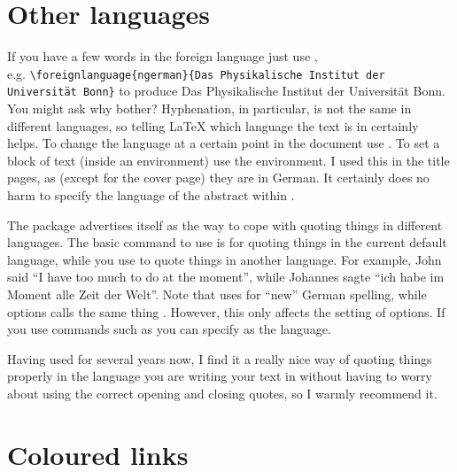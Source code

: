 \section{Other languages}%
\label{sec:layout:lang}

If you have a few words in the foreign language just use
,\\
e.g. \texttt{\textbackslash foreignlanguage\{ngerman\}\{Das
  Physikalische Institut der Universität Bonn\}}  to produce \foreignlanguage{ngerman}{Das
  Physikalische Institut der Universität Bonn}. You might ask why
bother? Hyphenation, in particular, is not the same in different
languages, so telling \LaTeX{} which language the text is in certainly
helps. To change the language at a certain point in the document use
. To set a block of text (inside an environment)
use the  environment. I used this in the title
pages, as (except for the cover page) they are in German. It certainly
does no harm to specify the language of the abstract
within .

The  package advertises itself as the way to cope
with quoting things in different languages. The basic
command to use is 
for quoting things in the current default language, while you
use  to quote things in another language. For
example, John said \enquote{I have too much to do at the moment},
while \foreignlanguage{ngerman}{Johannes sagte}
\foreignquote{ngerman}{ich habe im Moment alle Zeit der Welt}.
Note that  uses  for \enquote{new} German
spelling, while  options calls the same thing
. However, this only affects the setting of options. If
you use commands such as  you can specify
 as the language.

Having used  for several years now, I find it a
really nice way of quoting things properly in the language you are
writing your text in without having to worry about using the correct
opening and closing quotes, so I warmly recommend it.

\section{Coloured links}%
\label{sec:layout:link}

